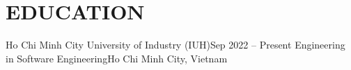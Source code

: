 \section{EDUCATION}
\resumeSubHeadingListStart

  \resumeSubheading
    {Ho Chi Minh City University of Industry (IUH)}{Sep 2022 -- Present}
    {Engineering in Software Engineering}{Ho Chi Minh City, Vietnam}
    \resumeItemListStart
    \resumeItemListEnd

\resumeSubHeadingListEnd
